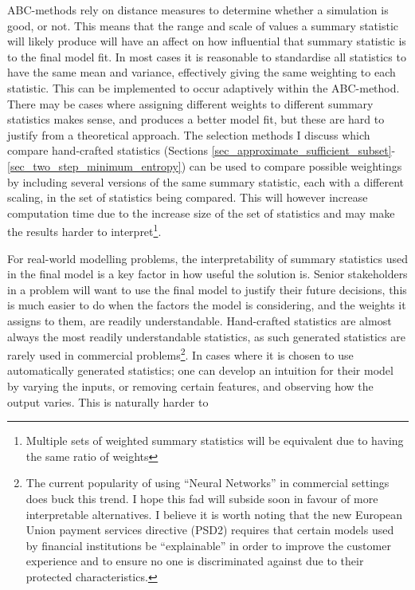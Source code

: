 \documentclass[11pt,a4paper]{article}
\theoremstyle{break}
\begin{document}
  \par ABC-methods rely on distance measures to determine whether a simulation is good, or not. This means that the range and scale of values a summary statistic will likely produce will have an affect on how influential that summary statistic is to the final model fit. In most cases it is reasonable to standardise all statistics to have the same mean and variance, effectively giving the same weighting to each statistic. This can be implemented to occur adaptively within the ABC-method. There may be cases %
  where assigning different weights to different summary statistics makes sense, and produces a better model fit, but these are hard to justify from a theoretical approach. The selection methods I discuss which compare hand-crafted statistics (Sections \ref{sec_approximate_sufficient_subset}-\ref{sec_two_step_minimum_entropy}) can be used to compare possible weightings by including several versions of the same summary statistic, each with a different scaling, in the set of statistics being compared. This will however increase computation time due to the increase size of the set of statistics and may make the results harder to interpret\footnote{Multiple sets of weighted summary statistics will be equivalent due to having the same ratio of weights}.

  \par For real-world modelling problems, the interpretability of summary statistics used in the final model is a key factor in how useful the solution is. Senior stakeholders in a problem will want to use the final model to justify their future decisions, this is much easier to do when the factors the model is considering, and the weights it assigns to them, are readily understandable. Hand-crafted statistics are almost always the most readily understandable statistics, as such generated statistics are rarely used in commercial problems\footnote{The current popularity of using ``Neural Networks'' in commercial settings does buck this trend. I hope this fad will subside soon in favour of more interpretable alternatives. I believe it is worth noting that the new European Union payment services directive (PSD2) requires that certain models used by financial institutions be ``explainable'' in order to improve the customer experience and to ensure no one is discriminated against due to their protected characteristics.}. In cases where it is chosen to use automatically generated statistics; one can develop an intuition for their model by varying the inputs, or removing certain features, and observing how the output varies. This is naturally harder to
\end{document}
